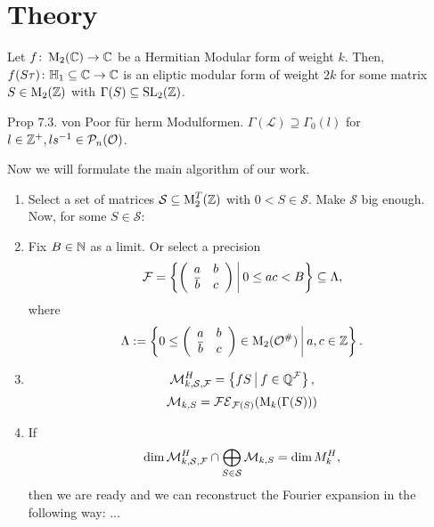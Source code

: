 
\section{Theory}


\begin{lemma}
Let $f \colon \operatorname{M}_2(\mathbb{C}) \rightarrow \mathbb{C}$ be a Hermitian Modular form of weight $k$.
Then, $f(S \tau) \colon \mathbb{H}_1 \subseteq \mathbb{C} \rightarrow \mathbb{C}$ is an eliptic modular form of weight $2k$ for some matrix $S \in \operatorname{M}_2(\mathbb{Z})$ with $\Gamma(S) \subseteq \operatorname{SL}_2(\mathbb{Z})$.
\end{lemma}


\begin{lemma}
Prop 7.3. von Poor für herm Modulformen.
$\Gamma(\mathcal{L}) \supseteq \Gamma_0(l)$ for $l \in \mathbb{Z}^+, ls^{-1} \in \mathcal{P}_n(\mathcal{O})$.
\end{lemma}


Now we will formulate the main algorithm of our work.

\begin{algo}
\begin{enumerate}
\item Select a set of matrices $\mathcal{S} \subseteq \operatorname{M}_2^T(\mathbb{Z})$ with $0 < S \in \mathcal{S}$. Make $\mathcal{S}$ big enough. Now, for some $S \in \mathcal{S}$:

\item Fix $B \in \mathbb{N}$ as a limit. Or select a precision
\[ \F = \Set{\SimpleMatrix{a}{b}{\overline b}{c}}{0 \le a c < B} \subseteq \Lambda , \]
where
\[ \Lambda := \Set{0 \le \SimpleMatrix{a}{b}{\overline b}{c} \in \M_2(\curlO^\#)}{a,c \in \Z } . \]

\item \[ \mathcal{M}_{k,\mathcal{S},\F}^H = \Set{f S}{f \in \Q^\F} , \]
\[ \mathcal{M}_{k,S} = \mathcal{FE}_{\mathcal{F}(S)}(\operatorname{M}_k(\Gamma(S))) \]

\item If
\[ \dim \mathcal{M}_{k,\mathcal{S},\mathcal{F}}^H \cap \bigoplus_{S \in \mathcal{S}} \mathcal{M}_{k,S}
= \dim M^H_k , \]
then we are ready and we can reconstruct the Fourier expansion in the following way: ...

\end{enumerate}
\end{algo}

